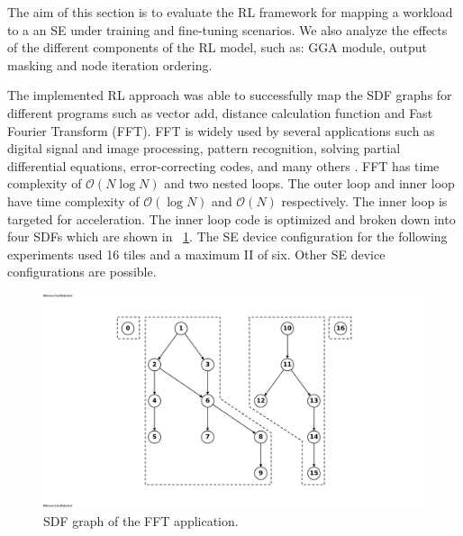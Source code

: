 
The aim of this section is to evaluate the RL framework for mapping a workload to a an SE under training and fine-tuning scenarios. 
We also analyze the effects of the different components of the RL model, such as: GGA module, output masking and node iteration ordering.

The implemented RL approach was able to successfully map the SDF graphs for different programs such as vector add, distance calculation function and Fast Fourier Transform (FFT). 
FFT is widely used by several applications such as digital signal and image processing, pattern recognition, solving partial differential equations, error-correcting codes, and many others \cite{814659}.
FFT has time complexity of $\mathcal{O}(N\log{N})$ and two nested loops.
The outer loop and inner loop have time complexity of $\mathcal{O}(\log{N})$ and $\mathcal{O}(N)$ respectively.
The inner loop is targeted for acceleration.
The inner loop code is optimized and broken down into four SDFs which are shown in \figurename~\ref{fig:ifft_graph}.
The SE device configuration for the following experiments used 16 tiles and a maximum II of six.
Other SE device configurations are possible.

\begin{figure}[tb]
  \centering
  \includegraphics[width=\linewidth]{fig/ifft_graph.pdf}
  \caption{SDF graph of the FFT application.}
  \label{fig:ifft_graph}
\end{figure}


